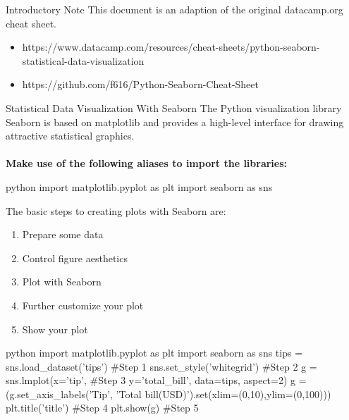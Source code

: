 \begin{alerttextbox}{Introductory Note}
This document is an adaption of the original datacamp.org cheat sheet.\\
\begin{itemize}
    \item {https://www.datacamp.com/resources/cheat-sheets/python-seaborn-statistical-data-visualization}
    \item {https://github.com/f616/Python-Seaborn-Cheat-Sheet}
\end{itemize}

\end{alerttextbox}



\begin{myblock}{Statistical Data Visualization With Seaborn}
{The Python visualization library Seaborn is based on matplotlib and provides a high-level interface for drawing attractive statistical graphics.\\\\}
\textbf{Make use of the following aliases to import the libraries:}
\begin{codebox}{python}{}
import matplotlib.pyplot as plt
import seaborn as sns
\end{codebox}
{The basic steps to creating plots with Seaborn are:\\}
\begin{enumerate}
    \item Prepare some data
    \item Control figure aesthetics
    \item Plot with Seaborn
    \item Further customize your plot
    \item Show your plot
\end{enumerate}
\begin{codebox}{python}{}
import matplotlib.pyplot as plt
import seaborn as sns
tips = sns.load_dataset('tips')  #Step 1
sns.set_style('whitegrid')  #Step 2
g = sns.lmplot(x='tip',  #Step 3
                y='total_bill',
                data=tips,
                aspect=2)
g = (g.set_axis_labels('Tip', 'Total bill(USD)').set(xlim=(0,10),ylim=(0,100)))
plt.title('title')  #Step 4
plt.show(g)  #Step 5
\end{codebox}
\end{myblock}


